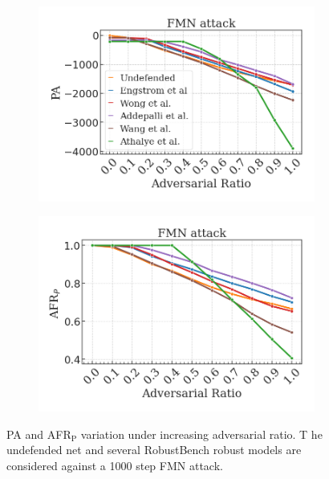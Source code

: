 \begin{figure}[H]
    \centering
    \begin{subfigure}[b]{0.45\textwidth}
        \centering
        \includegraphics[width=\textwidth]{img/results_discussion/adversarial/FMN_logPA.png}
    \end{subfigure}
    \begin{subfigure}[b]{0.45\textwidth}
        \centering
        \includegraphics[width=\textwidth]{img/results_discussion/adversarial/FMN_1000_AFR_pred.png}
    \end{subfigure}

    \caption{PA and AFR$_{\text{P}}$ variation under increasing adversarial ratio. T
    he undefended net and several RobustBench robust models are considered 
    against a 1000 step FMN attack.}
    \label{fig:appendix_adversarial_afrpred_fmn}
\end{figure}

